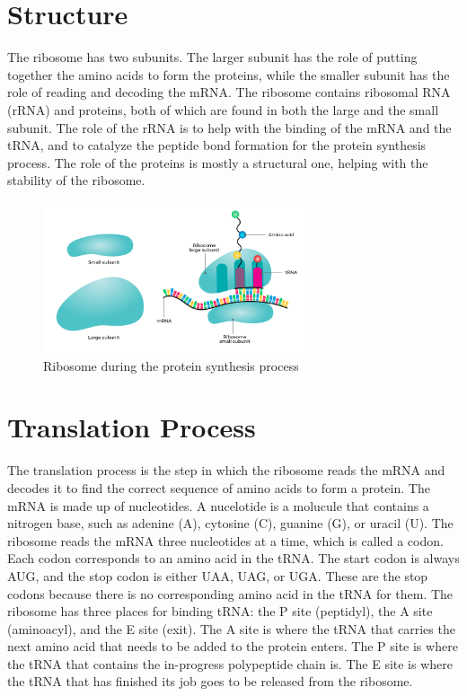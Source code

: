 \documentclass{article}
\begin{document}
\section{Structure}
The ribosome has two subunits. The larger subunit has the role of putting together the amino acids to form the proteins, while the smaller subunit has the role of reading and decoding the mRNA. The ribosome contains ribosomal RNA (rRNA) and proteins, both of which are found in both the large and the small subunit. The role of the rRNA is to help with the binding of the mRNA and the tRNA, and to catalyze the peptide bond formation for the protein synthesis process. The role of the proteins is mostly a structural one, helping with the stability of the ribosome.

\begin{flushleft}
    \begin{figure}
        \includegraphics[width=0.7\textwidth]{Ribosome.png}
        \caption{Ribosome during the protein synthesis process}
    \end{figure}
\end{flushleft}

\section{Translation Process}
The translation process is the step in which the ribosome reads the mRNA and decodes it to find the correct sequence of amino acids to form a protein. The mRNA is made up of nucleotides. A nucelotide is a molucule that contains a nitrogen base, such as adenine (A), cytosine (C), guanine (G), or uracil (U). The ribosome reads the mRNA three nucleotides at a time, which is called a codon. Each codon corresponds to an amino acid in the tRNA. The start codon is always AUG, and the stop codon is either UAA, UAG, or UGA. These are the stop codons because there is no corresponding amino acid in the tRNA for them. The ribosome has three places for binding tRNA: the P site (peptidyl), the A site (aminoacyl), and the E site (exit). The A site is where the tRNA that carries the next amino acid that needs to be added to the protein enters. The P site is where the tRNA that contains the in-progress polypeptide chain is. The E site is where the tRNA that has finished its job goes to be released from the ribosome.
\end{document}

